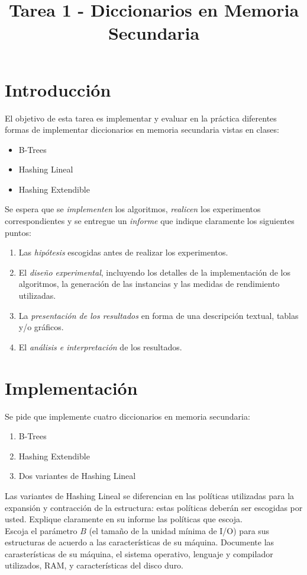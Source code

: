 \documentclass[dcc,uchile]{fcfmcourse}
\title{Tarea 1 - Diccionarios en Memoria Secundaria}
\begin{document}
\captionsetup[table]{name=Tabla}
\captionsetup[table]{name=Figura}

\maketitle
\vspace{-1ex}
\section{Introducción}
El objetivo de esta tarea es implementar y evaluar en la práctica diferentes formas de implementar diccionarios en memoria secundaria vistas en clases:
\begin{itemize}
    \item B-Trees
    \item Hashing Lineal
    \item Hashing Extendible
\end{itemize}

Se espera que se \textit{implementen} los algoritmos, \textit{realicen} los experimentos correspondientes y se entregue un \textit{informe} que indique claramente los siguientes puntos:
\begin{enumerate}[1.]
    \item Las \textit{hipótesis} escogidas antes de realizar los experimentos.
    \item El \textit{diseño experimental}, incluyendo los detalles de la implementación de los algoritmos, la generación de las instancias y las medidas de rendimiento utilizadas.
    \item La \textit{presentación de los resultados} en forma de una descripción textual, tablas y/o gráficos.
    \item El \textit{análisis e interpretación} de los resultados.
\end{enumerate}
\section{Implementación}
Se pide que implemente cuatro diccionarios en memoria secundaria:
\begin{enumerate}[1.]
    \item B-Trees
    \item Hashing Extendible
    \item Dos variantes de Hashing Lineal
\end{enumerate}
Las variantes de Hashing Lineal se diferencian en las políticas utilizadas para la expansión y contracción de la estructura: estas políticas deberán ser escogidas por usted. Explique claramente en su informe las políticas que escoja. \\
Escoja el parámetro $B$ (el tamaño de la unidad mínima de I/O) para sus estructuras de acuerdo a las características de su máquina. Documente las carasterísticas de su máquina, el sistema operativo, lenguaje y compilador utilizados, RAM, y características del disco duro.
\end{document}
